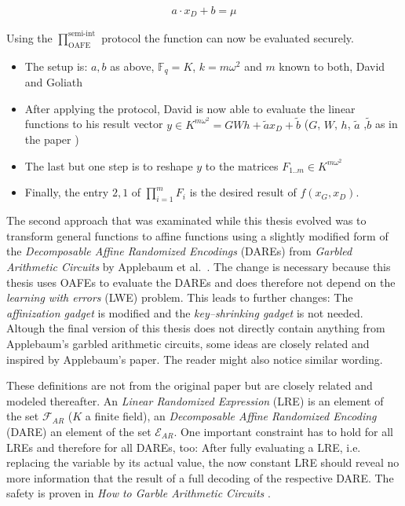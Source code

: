 \begin{align}
a \cdot x_D + b = \mu
\end{align}

Using the $\prod^{\text{semi-int}}_{\text{OAFE}}$ protocol\cite{davidgoliath}
the function can now be evaluated securely.

\begin{itemize}

\item The setup is: $a, b$ as above, $\mathbb{F}_q = K$, $k = m\omega^2$ and $m$
known to both, David and Goliath

\item After applying the protocol, David is now able to evaluate the linear
functions to his result vector $y \in K^{m\omega^2} = GWh + \tilde{a}x_D +
\tilde{b}$ ($G$, $W$, $h$, $\tilde{a}$ ,$\tilde{b}$ as in the paper
\cite{davidgoliath})

\item The last but one step is to reshape $y$ to the matrices $F_{1..m}
\in K^{m\omega^2}$

\item Finally, the entry $2, 1$ of $\prod_{i=1}^m F_i$ is the desired result of
$f(x_G,x_D)$.

\end{itemize}


%
%
\label{sec:dare}

The second approach that was examinated while this thesis evolved was to
transform general functions to affine functions using a slightly modified form
of the \emph{Decomposable Affine Randomized Encodings} (DAREs) from
\emph{Garbled Arithmetic Circuits} by Applebaum et al.\ \cite{gac2012}. The
change is necessary because this thesis uses OAFEs to evaluate the DAREs
and does therefore not depend on the \emph{learning with errors} (LWE) problem.
This leads to further changes: The \emph{affinization gadget} \cite{gac2012} is
modified and the \emph{key--shrinking gadget} \cite{gac2012} is not needed.
Altough the final version of this thesis does not directly contain anything from
Applebaum's garbled arithmetic circuits, some ideas are closely related and
inspired by Applebaum's paper. The reader might also notice similar wording.


\label{sec:affinization_definitions}

These definitions are not from the original paper but are closely related and
modeled thereafter. An \emph{Linear Randomized Expression} (LRE) is an element
of the set $\mathcal{F}_{AR}$ ($K$ a finite field), an \emph{Decomposable Affine
Randomized Encoding} (DARE) an element of the set $\mathcal{E}_{AR}$. One
important constraint has to hold for all LREs and therefore for all DAREs, too:
After fully evaluating a LRE, i.e. replacing the variable by its actual value,
the now constant LRE should reveal no more information that the result of a full
decoding of the respective DARE. The safety is proven in \emph{How to Garble
Arithmetic Circuits} \cite{gac2012}.

